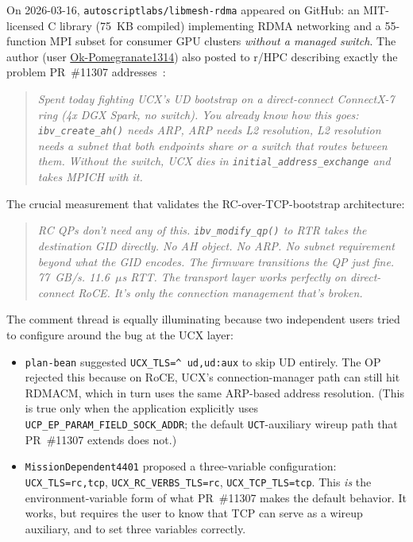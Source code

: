 \documentclass[11pt]{article}
\begin{document}
On 2026-03-16, \texttt{autoscriptlabs/libmesh-rdma} appeared on GitHub:
an MIT-licensed C library (75~KB compiled) implementing RDMA networking
and a 55-function MPI subset for consumer GPU clusters \emph{without a
managed switch}. The author (user
\href{https://www.reddit.com/user/Ok-Pomegranate1314}{Ok-Pomegranate1314})
also posted to r/HPC describing exactly the problem PR~\#11307
addresses~\cite{reddit_directconnect_roce}:

\begin{quote}\small\itshape
Spent today fighting UCX's UD bootstrap on a direct-connect
ConnectX-7 ring (4x DGX Spark, no switch). You already know how this
goes: \texttt{ibv\_create\_ah()} needs ARP, ARP needs L2 resolution,
L2 resolution needs a subnet that both endpoints share or a switch
that routes between them. Without the switch, UCX dies in
\texttt{initial\_address\_exchange} and takes MPICH with it.
\end{quote}

The crucial measurement that validates the RC-over-TCP-bootstrap
architecture:

\begin{quote}\small\itshape
RC QPs don't need any of this. \texttt{ibv\_modify\_qp()} to RTR takes
the destination GID directly. No AH object. No ARP. No subnet
requirement beyond what the GID encodes. The firmware transitions the
QP just fine. 77~GB/s. 11.6~$\mu$s RTT. The transport layer works
perfectly on direct-connect RoCE. It's only the connection management
that's broken.
\end{quote}

The comment thread is equally illuminating because two independent
users tried to configure around the bug at the UCX layer:

\begin{itemize}
  \item \texttt{plan-bean} suggested \texttt{UCX\_TLS=\textasciicircum
    ud,ud:aux} to skip UD entirely. The OP rejected this because on
    RoCE, UCX's connection-manager path can still hit RDMACM, which in
    turn uses the same ARP-based address resolution. (This is true only
    when the application explicitly uses \texttt{UCP\_EP\_PARAM\_FIELD\_SOCK\_ADDR};
    the default \texttt{UCT}-auxiliary wireup path that PR~\#11307
    extends does not.)
  \item \texttt{MissionDependent4401} proposed a three-variable
    configuration: \texttt{UCX\_TLS=rc,tcp},
    \texttt{UCX\_RC\_VERBS\_TLS=rc}, \texttt{UCX\_TCP\_TLS=tcp}. This
    \emph{is} the environment-variable form of what PR~\#11307 makes
    the default behavior. It works, but requires the user to know that
    TCP can serve as a wireup auxiliary, and to set three variables
    correctly.
\end{itemize}
\end{document}
